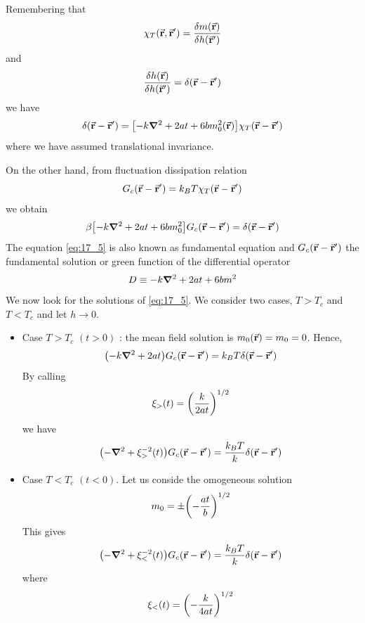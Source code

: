 \documentclass[../main/main.tex]{subfiles}
\begin{document}
Remembering that
\begin{equation}
  \chi _T (\va{r},\va{r}') = \frac{\delta m(\va{r})}{\delta h (\va{r}')}
\end{equation}
and
\begin{equation}
  \frac{\delta h (\va{r})}{\delta h (\va{r}')} = \delta (\va{r}-\va{r}')
\end{equation}
we have
\begin{equation}
  \delta  (\va{r} - \va{r}')  = \qty[- k \grad ^2 + 2 a t    + 6 b m_0^2 (\va{r}) ] \chi _T (\va{r}-\va{r}')
\end{equation}
where we have assumed translational invariance.

On the other hand, from fluctuation dissipation relation
\begin{equation}
  G_c (\va{r}-\va{r}') = k_B T \chi _T (\va{r}-\va{r}')
\end{equation}
we obtain
\begin{equation}
  \beta \qty[-k \grad ^2 + 2 a t + 6 b m_0 ^2 ] G_c (\va{r}-\va{r}') = \delta (\va{r}- \va{r}')
  \label{eq:17_5}
\end{equation}
The equation \eqref{eq:17_5} is also known as fundamental equation and \( G_c (\va{r}- \va{r}') \)  the fundamental solution or green function of the differential operator
\begin{equation}
  D \equiv - k \grad ^2 + 2 a t + 6 b m^2
\end{equation}
We now look for the solutions of \eqref{eq:17_5}.  We consider two cases, \( T > T_c \) and \( T < T_c \) and let \( h \rightarrow 0 \).
\begin{itemize}
\item Case \( T > T_c \) \( (t>0) \) : the mean field solution is \( m_0 (\va{r}) = m_0 = 0 \). Hence,
\begin{equation}
  \qty(-k \grad ^2 + 2 a t ) G_c (\va{r}-\va{r}') = k_B T \delta (\va{r}-\va{r}')
  \label{eq:17_6}
\end{equation}
By calling
\begin{equation}
  \xi_> (t) = \qty(\frac{k}{2 a t })^{1/2}
\end{equation}
we have
\begin{equation}
  \qty(-\grad ^2 + \xi _> ^{-2} (t)) G_c (\va{r}-\va{r}') = \frac{k_B T}{k} \delta (\va{r}-\va{r}')
\end{equation}
\item Case \( T < T_c \) \( (t<0) \). Let us conside the omogeneous solution
\begin{equation}
  m_0 = \pm \qty(-\frac{at}{b})^{1/2}
\end{equation}
This gives
\begin{equation}
  \qty(-\grad ^2 + \xi _<^{-2} (t))G_c (\va{r}- \va{r}') = \frac{k_B T}{k} \delta (\va{r}- \va{r}')
\end{equation}
where
\begin{equation}
  \xi _{<} (t) = \qty(- \frac{k}{4at})^{1/2}
\end{equation}
\end{itemize}
\end{document}
